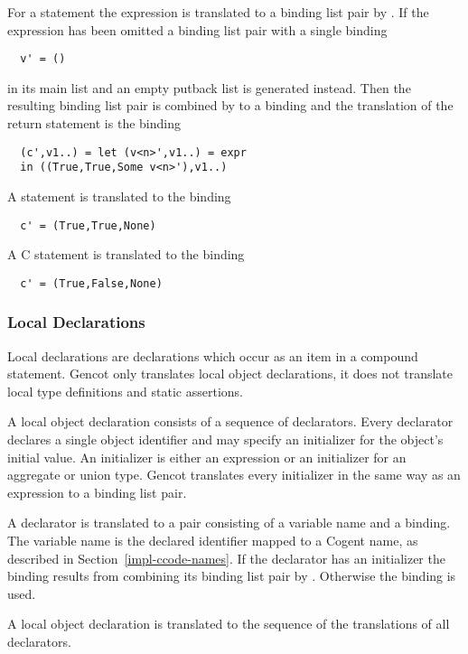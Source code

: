For a  statement the expression is translated to a binding list pair by . If the expression has been
omitted a binding list pair with a single binding
\begin{verbatim}
  v' = ()
\end{verbatim}
in its main list and an empty putback list is generated instead. Then the resulting binding list pair is combined by 
to a binding  and the translation of the return statement
is the binding
\begin{verbatim}
  (c',v1..) = let (v<n>',v1..) = expr
  in ((True,True,Some v<n>'),v1..)
\end{verbatim}

A  statement is translated to the binding
\begin{verbatim}
  c' = (True,True,None)
\end{verbatim}

A C  statement is translated to the binding
\begin{verbatim}
  c' = (True,False,None)
\end{verbatim}

\subsubsection{Local Declarations}

Local declarations are declarations which occur as an item in a compound statement. Gencot only translates local object declarations, 
it does not translate local type definitions and static assertions. 

A local object declaration consists of a sequence of declarators. Every declarator declares a single object identifier and may 
specify an initializer for the object's initial value. An initializer is either an expression or an initializer for an aggregate or
union type. Gencot translates every initializer in the same way as an expression to a binding list pair.

A declarator is translated to a pair consisting of a variable name and a binding. The variable name is the declared identifier
mapped to a Cogent name, as described in Section~\ref{impl-ccode-names}. If the declarator has an initializer the binding
results from combining its binding list pair by . Otherwise the binding  is used.

A local object declaration is translated to the sequence of the translations of all declarators.

